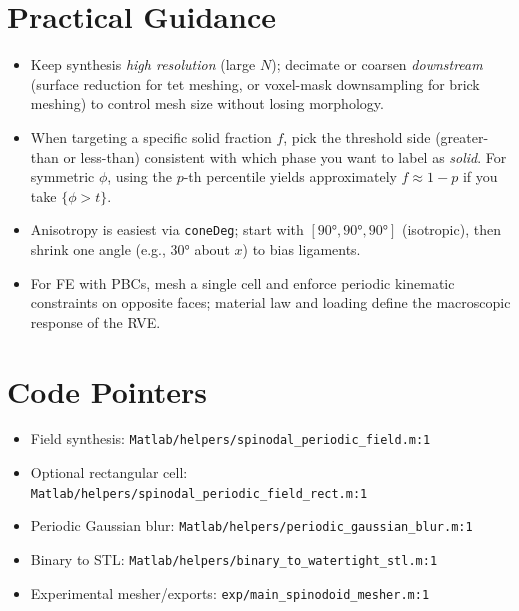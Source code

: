 \documentclass[11pt,a4paper]{article}
\begin{document}
\section{Practical Guidance}
\begin{itemize}
  \item Keep synthesis \emph{high resolution} (large $N$); decimate or coarsen \emph{downstream} (surface reduction for tet meshing, or voxel-mask downsampling for brick meshing) to control mesh size without losing morphology.
  \item When targeting a specific solid fraction $f$, pick the threshold side (greater-than or less-than) consistent with which phase you want to label as \emph{solid}. For symmetric $\phi$, using the $p$-th percentile yields approximately $f\approx 1-p$ if you take $\{\phi>t\}$.
  \item Anisotropy is easiest via \texttt{coneDeg}; start with $[\ang{90},\ang{90},\ang{90}]$ (isotropic), then shrink one angle (e.g., $\ang{30}$ about $x$) to bias ligaments.
  \item For FE with PBCs, mesh a single cell and enforce periodic kinematic constraints on opposite faces; material law and loading define the macroscopic response of the RVE.
\end{itemize}

\section*{Code Pointers}
\begin{itemize}
  \item Field synthesis: \texttt{Matlab/helpers/spinodal\_periodic\_field.m:1}
  \item Optional rectangular cell: \texttt{Matlab/helpers/spinodal\_periodic\_field\_rect.m:1}
  \item Periodic Gaussian blur: \texttt{Matlab/helpers/periodic\_gaussian\_blur.m:1}
  \item Binary to STL: \texttt{Matlab/helpers/binary\_to\_watertight\_stl.m:1}
  \item Experimental mesher/exports: \texttt{exp/main\_spinodoid\_mesher.m:1}
\end{itemize}
\end{document}
